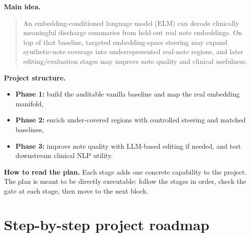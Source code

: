 \documentclass[11pt]{article}
\begin{document}
\textbf{Main idea.}
\begin{quote}
An embedding-conditioned language model (ELM) can decode clinically meaningful discharge summaries from held-out real note embeddings. On top of that baseline, targeted embedding-space steering may expand synthetic-note coverage into underrepresented real-note regions, and later editing/evaluation stages may improve note quality and clinical usefulness.
\end{quote}

\textbf{Project structure.}
\begin{itemize}[nosep]
  \item \textbf{Phase 1:} build the auditable vanilla baseline and map the real embedding manifold,
  \item \textbf{Phase 2:} enrich under-covered regions with controlled steering and matched baselines,
  \item \textbf{Phase 3:} improve note quality with LLM-based editing if needed, and test downstream clinical NLP utility.
\end{itemize}

\textbf{How to read the plan.}
Each stage adds one concrete capability to the project. The plan is meant to be directly executable: follow the stages in order, check the gate at each stage, then move to the next block.

\section{Step-by-step project roadmap}
\end{document}
